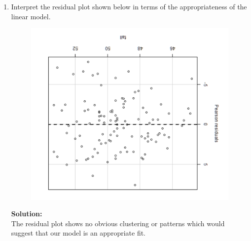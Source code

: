\documentclass[12pt]{article}
\makeatletter
\theoremstyle{homework}
\newenvironment{exercise}[1]
{\def\@currentlabel{#1}\exercisecore}
{\endexercisecore}
\newcommand{\localhead}[1]{\par\smallskip\noindent\textbf{#1}\nobreak\\}%
\newcommand\solution{\localhead{Solution:}}
\makeatother
\begin{document}
\begin{exercise}{2}
\begin{enumerate}
    \item Interpret the residual plot shown below in terms of the appropriateness
    of the linear model.
    \begin{figure}[H]
      \begin{center}
      \includegraphics[width = .75 \textwidth]{Rplot03.png}
      \end{center}
    \end{figure}
    \solution The residual plot shows no obvious clustering or patterns which would
    suggest that our model is an appropriate fit.
  \end{enumerate}
\end{exercise}
\newpage
\end{document}
